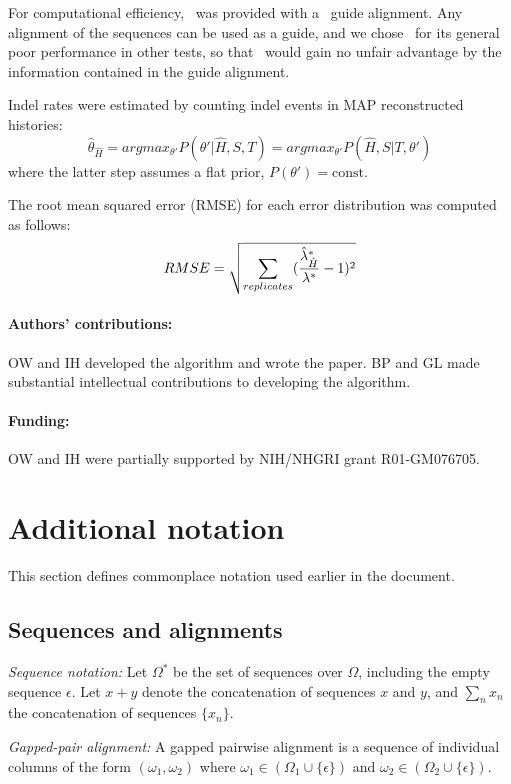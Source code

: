 \documentclass{article}
\newcommand{\eqnlabel}[1]{\label{Equations.#1}}
\newcommand\gappedalphabet[1]{(\Omega_{#1} \cup \{\epsilon\})}
\begin{document}
For computational efficiency,  \protpal\ was provided with a  \clustalw\ guide alignment.  Any alignment of the sequences can be used as a guide, and we chose \clustalw\ for its general poor performance in other tests, 
so that \protpal\ would gain no unfair advantage by the information contained in the guide alignment. 

Indel rates were estimated by counting indel events in MAP reconstructed histories:
\begin{equation}
\eqnlabel{mapHistoryParams}                      
\hat{\theta}_{\hat{H}} = argmax_{\theta'} P(\theta'|\hat{H},S,T) = argmax_{\theta'} P(\hat{H},S|T,\theta')
\end{equation}
where the latter step assumes a flat prior, $P(\theta') = \mbox{const.}$

The root mean squared error (RMSE) for each error distribution was computed as follows:
\begin{equation}
\eqnlabel{RMSE}
RMSE = \sqrt{ \sum_{replicates} (\rateRatio{*}-1)^2 }
\end{equation}


\paragraph{Authors' contributions:} OW and IH developed the algorithm and wrote the paper.  BP and GL made substantial intellectual contributions to developing the algorithm.  

\paragraph{Funding:} OW and IH were partially supported by NIH/NHGRI grant R01-GM076705.

\appendix
\section{Additional notation}
This section defines commonplace notation used earlier in the document.
\subsection{Sequences and alignments}
{\em Sequence notation:}
Let $\Omega^\ast$ be the set of sequences over $\Omega$, including the empty sequence $\epsilon$.
Let $x+y$ denote the concatenation of sequences $x$ and $y$, and $\sum_n x_n$ the concatenation of sequences $\{ x_n \}$.

{\em Gapped-pair alignment:}
A gapped pairwise alignment is a sequence of individual columns of the form $(\omega_1,\omega_2)$ where $\omega_1 \in \gappedalphabet{1}$ and $\omega_2 \in \gappedalphabet{2}$.
\end{document}
